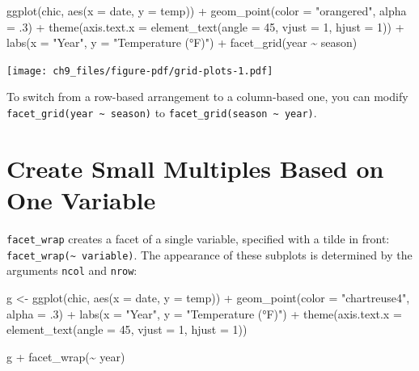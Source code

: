 \documentclass[
  letterpaper,
  DIV=11,
  numbers=noendperiod]{scrreprt}
\newenvironment{Shaded}{\begin{snugshade}}{\end{snugshade}}
\newcommand{\AttributeTok}[1]{\textcolor[rgb]{0.40,0.45,0.13}{#1}}
\newcommand{\DecValTok}[1]{\textcolor[rgb]{0.68,0.00,0.00}{#1}}
\newcommand{\FunctionTok}[1]{\textcolor[rgb]{0.28,0.35,0.67}{#1}}
\newcommand{\NormalTok}[1]{\textcolor[rgb]{0.00,0.23,0.31}{#1}}
\newcommand{\OtherTok}[1]{\textcolor[rgb]{0.00,0.23,0.31}{#1}}
\newcommand{\SpecialCharTok}[1]{\textcolor[rgb]{0.37,0.37,0.37}{#1}}
\newcommand{\StringTok}[1]{\textcolor[rgb]{0.13,0.47,0.30}{#1}}
\begin{document}
\begin{Shaded}
\begin{Highlighting}[]
\FunctionTok{ggplot}\NormalTok{(chic, }\FunctionTok{aes}\NormalTok{(}\AttributeTok{x =}\NormalTok{ date, }\AttributeTok{y =}\NormalTok{ temp)) }\SpecialCharTok{+}
  \FunctionTok{geom\_point}\NormalTok{(}\AttributeTok{color =} \StringTok{"orangered"}\NormalTok{, }\AttributeTok{alpha =}\NormalTok{ .}\DecValTok{3}\NormalTok{) }\SpecialCharTok{+}
  \FunctionTok{theme}\NormalTok{(}\AttributeTok{axis.text.x =} \FunctionTok{element\_text}\NormalTok{(}\AttributeTok{angle =} \DecValTok{45}\NormalTok{, }\AttributeTok{vjust =} \DecValTok{1}\NormalTok{, }\AttributeTok{hjust =} \DecValTok{1}\NormalTok{)) }\SpecialCharTok{+}
  \FunctionTok{labs}\NormalTok{(}\AttributeTok{x =} \StringTok{"Year"}\NormalTok{, }\AttributeTok{y =} \StringTok{"Temperature (°F)"}\NormalTok{) }\SpecialCharTok{+}
  \FunctionTok{facet\_grid}\NormalTok{(year }\SpecialCharTok{\textasciitilde{}}\NormalTok{ season)}
\end{Highlighting}
\end{Shaded}

\texttt{[image: ch9\_files/figure-pdf/grid-plots-1.pdf]}

To switch from a row-based arrangement to a column-based one, you can
modify \texttt{facet\_grid(year\ \textasciitilde{}\ season)} to
\texttt{facet\_grid(season\ \textasciitilde{}\ year)}.

\section{Create Small Multiples Based on One
Variable}\label{create-small-multiples-based-on-one-variable}

\texttt{facet\_wrap} creates a facet of a single variable, specified
with a tilde in front:
\texttt{facet\_wrap(\textasciitilde{}\ variable)}. The appearance of
these subplots is determined by the arguments \texttt{ncol} and
\texttt{nrow}:

\begin{Shaded}
\begin{Highlighting}[]
\NormalTok{g }\OtherTok{\textless{}{-}}
  \FunctionTok{ggplot}\NormalTok{(chic, }\FunctionTok{aes}\NormalTok{(}\AttributeTok{x =}\NormalTok{ date, }\AttributeTok{y =}\NormalTok{ temp)) }\SpecialCharTok{+}
    \FunctionTok{geom\_point}\NormalTok{(}\AttributeTok{color =} \StringTok{"chartreuse4"}\NormalTok{, }\AttributeTok{alpha =}\NormalTok{ .}\DecValTok{3}\NormalTok{) }\SpecialCharTok{+}
    \FunctionTok{labs}\NormalTok{(}\AttributeTok{x =} \StringTok{"Year"}\NormalTok{, }\AttributeTok{y =} \StringTok{"Temperature (°F)"}\NormalTok{) }\SpecialCharTok{+}
    \FunctionTok{theme}\NormalTok{(}\AttributeTok{axis.text.x =} \FunctionTok{element\_text}\NormalTok{(}\AttributeTok{angle =} \DecValTok{45}\NormalTok{, }\AttributeTok{vjust =} \DecValTok{1}\NormalTok{, }\AttributeTok{hjust =} \DecValTok{1}\NormalTok{))}

\NormalTok{g }\SpecialCharTok{+} \FunctionTok{facet\_wrap}\NormalTok{(}\SpecialCharTok{\textasciitilde{}}\NormalTok{ year)}
\end{Highlighting}
\end{Shaded}
\end{document}
